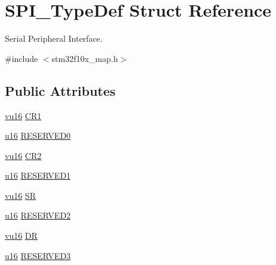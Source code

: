 \hypertarget{struct_s_p_i___type_def}{}\section{S\+P\+I\+\_\+\+Type\+Def Struct Reference}
\label{struct_s_p_i___type_def}


Serial Peripheral Interface.  




{\ttfamily \#include $<$stm32f10x\+\_\+map.\+h$>$}

\subsection*{Public Attributes}
\begin{DoxyCompactItemize}
\item 
\hyperlink{agilefox_2library_2inc_2stm32f10x__type_8h_a9e9f2c67df0bbcd2dd7753693525ee07}{vu16} \hyperlink{struct_s_p_i___type_def_a560772c677ab406a1bc85cde0cdb715e}{C\+R1}
\item 
\hyperlink{agilefox_2library_2inc_2stm32f10x__type_8h_a9e6c91d77e24643b888dbd1a1a590054}{u16} \hyperlink{struct_s_p_i___type_def_a90841821713da457e9fee69f0769b27a}{R\+E\+S\+E\+R\+V\+E\+D0}
\item 
\hyperlink{agilefox_2library_2inc_2stm32f10x__type_8h_a9e9f2c67df0bbcd2dd7753693525ee07}{vu16} \hyperlink{struct_s_p_i___type_def_aef295eda26be8d2d4c4f54d01a0f71e2}{C\+R2}
\item 
\hyperlink{agilefox_2library_2inc_2stm32f10x__type_8h_a9e6c91d77e24643b888dbd1a1a590054}{u16} \hyperlink{struct_s_p_i___type_def_a6ad48f24d207c19327cfa826448db747}{R\+E\+S\+E\+R\+V\+E\+D1}
\item 
\hyperlink{agilefox_2library_2inc_2stm32f10x__type_8h_a9e9f2c67df0bbcd2dd7753693525ee07}{vu16} \hyperlink{struct_s_p_i___type_def_a6bb5bc6c1e6ad605287e4144d43e422c}{SR}
\item 
\hyperlink{agilefox_2library_2inc_2stm32f10x__type_8h_a9e6c91d77e24643b888dbd1a1a590054}{u16} \hyperlink{struct_s_p_i___type_def_aaf60199bd7e567fc0e7c525d76a3b84c}{R\+E\+S\+E\+R\+V\+E\+D2}
\item 
\hyperlink{agilefox_2library_2inc_2stm32f10x__type_8h_a9e9f2c67df0bbcd2dd7753693525ee07}{vu16} \hyperlink{struct_s_p_i___type_def_ac2c753a044e887e24a99decc1fdec142}{DR}
\item 
\hyperlink{agilefox_2library_2inc_2stm32f10x__type_8h_a9e6c91d77e24643b888dbd1a1a590054}{u16} \hyperlink{struct_s_p_i___type_def_a2ab7da17a931f06c6e4baa5059775fe0}{R\+E\+S\+E\+R\+V\+E\+D3}

\end{DoxyCompactItemize}
